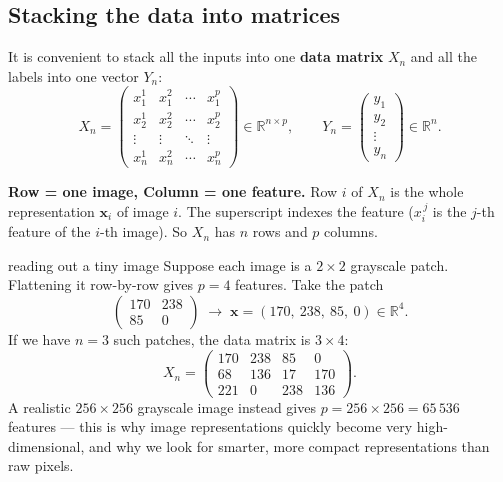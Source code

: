 \documentclass{report}
\newcommand{\R}{\mathbb{R}}
\newcommand{\xvec}{\mathbf{x}}
\newcommand{\Xmat}{X_n}
\begin{document}
\subsection{Stacking the data into matrices}

It is convenient to stack all the inputs into one \textbf{data matrix} $\Xmat$
and all the labels into one vector $Y_n$:
\[
\Xmat =
\begin{pmatrix}
x_1^1 & x_1^2 & \cdots & x_1^p \\[2pt]
x_2^1 & x_2^2 & \cdots & x_2^p \\
\vdots & \vdots & \ddots & \vdots \\
x_n^1 & x_n^2 & \cdots & x_n^p
\end{pmatrix}
\in \R^{n\times p},
\qquad
Y_n =
\begin{pmatrix}
y_1 \\ y_2 \\ \vdots \\ y_n
\end{pmatrix}
\in \R^{n}.
\]

\begin{keybox}
\textbf{Row = one image, Column = one feature.} Row $i$ of $\Xmat$ is the whole
representation $\xvec_i$ of image $i$. The superscript indexes the feature
($x_i^{\,j}$ is the $j$-th feature of the $i$-th image). So $\Xmat$ has $n$ rows
and $p$ columns.
\end{keybox}

\begin{exbox}{reading out a tiny image}
Suppose each image is a $2\times 2$ grayscale patch. Flattening it row-by-row
gives $p = 4$ features. Take the patch
\[
\begin{pmatrix} 170 & 238 \\ 85 & 0 \end{pmatrix}
\;\longrightarrow\;
\xvec = (170,\ 238,\ 85,\ 0) \in \R^4 .
\]
If we have $n=3$ such patches, the data matrix is $3\times 4$:
\[
\Xmat =
\begin{pmatrix}
170 & 238 & 85 & 0 \\
68  & 136 & 17 & 170 \\
221 & 0   & 238 & 136
\end{pmatrix}.
\]
A realistic $256\times256$ grayscale image instead gives
$p = 256\times256 = 65\,536$ features --- this is why image representations
quickly become very high-dimensional, and why we look for smarter, more compact
representations than raw pixels.
\end{exbox}
\end{document}
